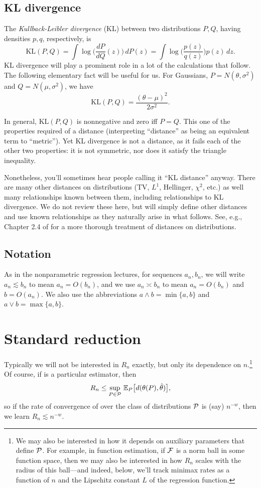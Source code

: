 \documentclass{article}
\begin{document}
\subsection{KL divergence}

\def\KL{\mathrm{KL}}

The \emph{Kullback-Leibler divergence} (KL) between two distributions $P,Q$,
having densities $p,q$, respectively, is 
\[
\KL(P,Q) = \int \log\bigg( \frac{dP}{dQ}(z) \bigg) \, dP(z)
= \int \log\bigg( \frac{p(z)}{q(z)} \bigg) p(z) \, dz.
\]
KL divergence will play a prominent role in a lot of the calculations that
follow. The following elementary fact will be useful for us. For Gaussians, $P = 
N(\theta, \sigma^2)$ and $Q = N(\mu, \sigma^2)$, we have  
\[
\KL(P, Q) = \frac{(\theta-\mu)^2}{2\sigma^2}.
\]

In general, $\KL(P,Q)$ is nonnegative and zero iff $P=Q$. This one of the
properties required of a distance (interpreting ``distance'' as being an
equivalent term to ``metric''). Yet KL divergence is not a distance, as it fails
each of the other two properties: it is not symmetric, nor does it satisfy the
triangle inequality.

Nonetheless, you'll sometimes hear people calling it ``KL distance''
anyway. There are many other distances on distributions (TV, $L^1$, Hellinger,
$\chi^2$, etc.) as well many relationships known between them, including
relationships to KL divergence. We do not review these here, but will simply
define other distances and use known relationships as they naturally arise in
what follows. See, e.g., Chapter 2.4 of \citet{tsybakov2009introduction} for a
more thorough treatment of distances on distributions.     

\subsection{Notation}

As in the nonparametric regression lectures, for sequences $a_n,b_n$, we will
write $a_n \lesssim b_n$ to mean $a_n = O(b_n)$, and we use $a_n \asymp b_n$ to
mean $a_n = O(b_n)$ and $b = O(a_n)$. We also use the abbreviations $a \wedge b
= \min\{a,b\}$ and $a \vee b = \max\{a,b\}$.  

\section{Standard reduction}

Typically we will not be interested in $R_n$ exactly, but only its dependence on
$n$.\footnote{We may also be interested in how it depends on auxiliary
  parameters that define $\mathcal{P}$. For example, in function estimation, if $\mathcal{F}$ is
  a norm ball in some function space, then we may also be interested in how
  $R_n$ scales with the radius of this ball---and indeed, below, we'll track
  minimax rates as a function of $n$ and the Lipschitz constant $L$ of the
  regression function.}  
Of course, if \smash{$\htheta$} is a particular estimator, then 
\[
R_n \leq \sup_{P \in \mathcal{P}} \, \mathbb{E}_P \big[ d(\theta(P), \hat{\theta}) \big], 
\]
so if the rate of convergence of \smash{$\htheta$} over the class of
distributions $\mathcal{P}$ is (say) $n^{-w}$, then we learn $R_n\lesssim n^{-w}$.  
\end{document}
